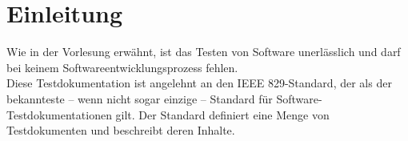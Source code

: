 

\chapter{Einleitung}
Wie in der Vorlesung erw\"ahnt, ist das Testen von Software unerl\"asslich und darf
bei keinem Softwareentwicklungsprozess fehlen.\\

Diese Testdokumentation ist angelehnt an den IEEE 829-Standard, der als
der bekannteste -- wenn nicht sogar einzige -- Standard f\"ur Software-Testdokumentationen 
gilt. Der Standard definiert eine Menge von Testdokumenten
und beschreibt deren Inhalte. 
